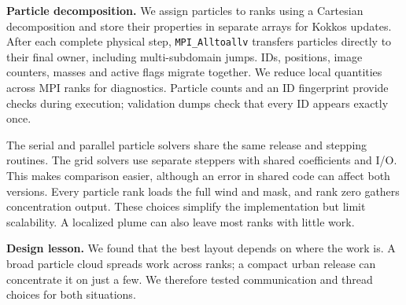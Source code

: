 \documentclass[11pt,a4paper]{article}
\begin{document}
\textbf{Particle decomposition.} We assign particles to ranks using a Cartesian decomposition and store their properties in separate arrays for Kokkos updates. After each complete physical step, \texttt{MPI\_Alltoallv} transfers particles directly to their final owner, including multi-subdomain jumps. IDs, positions, image counters, masses and active flags migrate together. We reduce local quantities across MPI ranks for diagnostics. Particle counts and an ID fingerprint provide checks during execution; validation dumps check that every ID appears exactly once.

The serial and parallel particle solvers share the same release and stepping routines. The grid solvers use separate steppers with shared coefficients and I/O. This makes comparison easier, although an error in shared code can affect both versions. Every particle rank loads the full wind and mask, and rank zero gathers concentration output. These choices simplify the implementation but limit scalability. A localized plume can also leave most ranks with little work.

\textbf{Design lesson.} We found that the best layout depends on where the work is. A broad particle cloud spreads work across ranks; a compact urban release can concentrate it on just a few. We therefore tested communication and thread choices for both situations.
\clearpage
\end{document}
